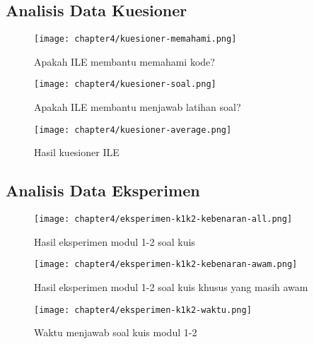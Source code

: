 \subsection{Analisis Data Kuesioner}
\begin{figure}[H]
  \centering
  \texttt{[image: chapter4/kuesioner-memahami.png]}
  \caption{Apakah ILE membantu memahami kode?} \label{fig:kuesioner-memahami}
\end{figure}
\blindtext

\begin{figure}[H]
  \centering
  \texttt{[image: chapter4/kuesioner-soal.png]}
  \caption{Apakah ILE membantu menjawab latihan soal?} \label{fig:kuesioner-soal}
\end{figure}
\blindtext

\begin{figure}[H]
  \centering
  \texttt{[image: chapter4/kuesioner-average.png]}
  \caption{Hasil kuesioner ILE} \label{fig:kuesioner-average}
\end{figure}
\blindtext

\subsection{Analisis Data Eksperimen}
\begin{figure}[H]
  \centering
  \texttt{[image: chapter4/eksperimen-k1k2-kebenaran-all.png]}
  \caption{Hasil eksperimen modul 1-2 soal kuis} \label{fig:eksperimen-k1k2-kebenaran-all}
\end{figure}
\begin{figure}[H]
  \centering
  \texttt{[image: chapter4/eksperimen-k1k2-kebenaran-awam.png]}
  \caption{Hasil eksperimen modul 1-2 soal kuis khusus yang masih awam} \label{fig:eksperimen-k1k2-kebenaran-awam}
\end{figure}
\blindtext
\begin{figure}[H]
  \centering
  \texttt{[image: chapter4/eksperimen-k1k2-waktu.png]}
  \caption{Waktu menjawab soal kuis modul 1-2} \label{fig:eksperimen-k1k2-waktu}
\end{figure}
\blindtext

